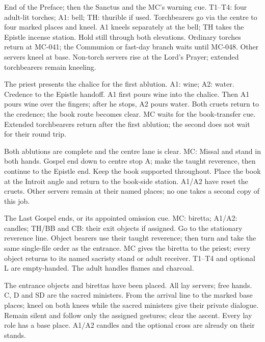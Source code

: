 {\SungCanonPositions}
{End of the Preface; then the Sanctus and the MC's warning cue.}
{T1--T4: four adult-lit torches; A1: bell; TH: thurible if used.}
{Torchbearers go via the centre to four marked places and kneel. A1
kneels separately at the bell; TH takes the Epistle incense station.}
{Hold still through both elevations. Ordinary torches return at MC-041;
the Communion or fast-day branch waits until MC-048.}
{Other servers kneel at base. Non-torch servers rise at the Lord's Prayer;
extended torchbearers remain kneeling.}

{\MCAblutionPositions}
{The priest presents the chalice for the first ablution.}
{A1: wine; A2: water.}
{Credence to the Epistle handoff. A1 first pours wine into the chalice.
Then A1 pours wine over the fingers; after he stops, A2 pours water.}
{Both cruets return to the credence; the book route becomes clear.}
{MC waits for the book-transfer cue. Extended torchbearers return after
the first ablution; the second does not wait for their round trip.}

{\MCBookReturnPositions}
{Both ablutions are complete and the centre lane is clear.}
{MC: Missal and stand in both hands.}
{Gospel end down to centre stop A; make the taught reverence, then
continue to the Epistle end. Keep the book supported throughout.}
{Place the book at the Introit angle and return to the book-side station.}
{A1/A2 have reset the cruets. Other servers remain at their named places;
no one takes a second copy of this job.}

{\SungDeparturePositions}
{The Last Gospel ends, or its appointed omission cue.}
{MC: biretta; A1/A2: candles; TH/BB and CB: their exit objects if assigned.}
{Go to the stationary reverence line. Object bearers use their taught
reverence; then turn and take the same single-file order as the entrance.}
{MC gives the biretta to the priest; every object returns to its named
sacristy stand or adult receiver.}
{T1--T4 and optional L are empty-handed. The adult handles flames and charcoal.}
\fi

\ifSolemnMassGuide
{}
{\SolemnFootPositions}
{The entrance objects and birettas have been placed.}
{All lay servers; free hands. C, D and SD are the sacred ministers.}
{From the arrival line to the marked base places; kneel on both knees
while the sacred ministers give their private dialogue.}
{Remain silent and follow only the assigned gestures; clear the ascent.}
{Every lay role has a base place. A1/A2 candles and the optional cross
are already on their stands.}


